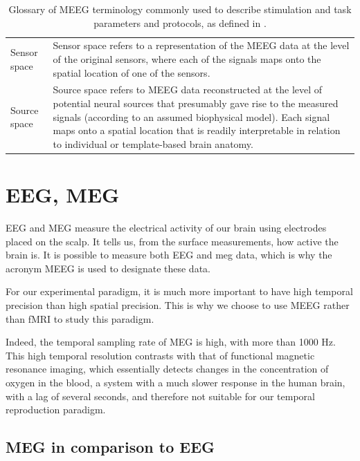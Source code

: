 \begin{table}[ht]
\begin{tabular}{@{}| p{3cm}|p{10cm}| @{}}
       Sensor space & Sensor space refers to a representation of the MEEG data at the level of the original sensors, where each of the signals maps onto the spatial location of one of the sensors.                                                                                                                                           \\
       Source space & Source space refers to MEEG data reconstructed at the level of potential neural sources that presumably gave rise to the measured signals (according to an assumed biophysical model). Each signal maps onto a spatial location that is readily interpretable in relation to individual or template-based brain anatomy. \\
       \hline
   \end{tabular}
   \caption[Glossary of MEEG terminology commonly used to describe stimulation and task parameters and protocol.]%
   {Glossary of MEEG terminology commonly used to describe stimulation and task parameters and protocols, as defined in \cite{pernet2018best}.}
 
   \label{Tab:Glossary_protocol}
\end{table}
 
 
 
\section{EEG, MEG}
 
EEG and MEG measure the electrical activity of our brain using electrodes placed on the scalp. It tells us, from the surface measurements, how active the brain is. It is possible to measure both EEG and meg data, which is why the acronym MEEG is used to designate these data.
 
For our experimental paradigm, it is much more important to have high temporal precision than high spatial precision. This is why we choose to use MEEG rather than fMRI to study this paradigm.
 
Indeed, the temporal sampling rate of MEG is high, with more than 1000 Hz. This high temporal resolution contrasts with that of functional magnetic resonance imaging, which essentially detects changes in the concentration of oxygen in the blood, a system with a much slower response in the human brain, with a lag of several seconds, and therefore not suitable for our temporal reproduction paradigm.
 
 
\subsection{MEG in comparison to EEG}
 
